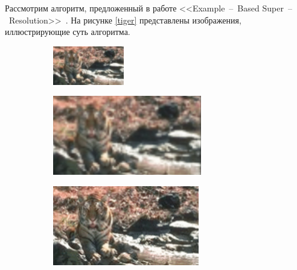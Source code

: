 Рассмотрим алгоритм, предложенный в работе <<Example~--~Based Super~--~Resolution>>~\cite{example}. На рисунке \ref{tiger} представлены изображения, иллюстрирующие суть алгоритма.

\begin{figure}[!h]
    \centering
    \begin{subfigure}{0.25\textwidth}
        \centering
        \includegraphics[width=\textwidth]{assets/tiger_a}
        \caption{}
    \end{subfigure}
    \begin{subfigure}{0.35\textwidth}
        \centering
        \includegraphics[width=\textwidth]{assets/tiger_b}
        \caption{}
    \end{subfigure}
    \begin{subfigure}{0.35\textwidth}
        \centering
        \includegraphics[width=\textwidth]{assets/tiger_c}

\end{subfigure}
\end{figure}
